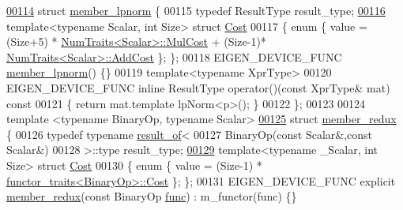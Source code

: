 \begin{DoxyCode}
\hyperlink{struct_eigen_1_1internal_1_1member__lpnorm}{00114} \textcolor{keyword}{struct }\hyperlink{struct_eigen_1_1internal_1_1member__lpnorm}{member\_lpnorm} \{
00115   \textcolor{keyword}{typedef} ResultType result\_type;
\hyperlink{struct_eigen_1_1internal_1_1member__lpnorm_1_1_cost}{00116}   \textcolor{keyword}{template}<\textcolor{keyword}{typename} Scalar, \textcolor{keywordtype}{int} Size> \textcolor{keyword}{struct }\hyperlink{struct_eigen_1_1internal_1_1member__lpnorm_1_1_cost}{Cost}
00117   \{ \textcolor{keyword}{enum} \{ value = (Size+5) * \hyperlink{group___core___module_struct_eigen_1_1_num_traits}{NumTraits<Scalar>::MulCost} + (Size-1)*
      \hyperlink{group___core___module_struct_eigen_1_1_num_traits}{NumTraits<Scalar>::AddCost} \}; \};
00118   EIGEN\_DEVICE\_FUNC \hyperlink{struct_eigen_1_1internal_1_1member__lpnorm}{member\_lpnorm}() \{\}
00119   \textcolor{keyword}{template}<\textcolor{keyword}{typename} XprType>
00120   EIGEN\_DEVICE\_FUNC \textcolor{keyword}{inline} ResultType operator()(\textcolor{keyword}{const} XprType& mat)\textcolor{keyword}{ const}
00121 \textcolor{keyword}{  }\{ \textcolor{keywordflow}{return} mat.template lpNorm<p>(); \}
00122 \};
00123 
00124 \textcolor{keyword}{template} <\textcolor{keyword}{typename} BinaryOp, \textcolor{keyword}{typename} Scalar>
\hyperlink{struct_eigen_1_1internal_1_1member__redux}{00125} \textcolor{keyword}{struct }\hyperlink{struct_eigen_1_1internal_1_1member__redux}{member\_redux} \{
00126   \textcolor{keyword}{typedef} \textcolor{keyword}{typename} \hyperlink{struct_eigen_1_1internal_1_1result__of}{result\_of}<
00127                      BinaryOp(\textcolor{keyword}{const} Scalar&,\textcolor{keyword}{const} Scalar&)
00128                    >::type  result\_type;
\hyperlink{struct_eigen_1_1internal_1_1member__redux_1_1_cost}{00129}   \textcolor{keyword}{template}<\textcolor{keyword}{typename} \_Scalar, \textcolor{keywordtype}{int} Size> \textcolor{keyword}{struct }\hyperlink{struct_eigen_1_1internal_1_1member__redux_1_1_cost}{Cost}
00130   \{ \textcolor{keyword}{enum} \{ value = (Size-1) * \hyperlink{struct_eigen_1_1internal_1_1functor__traits}{functor\_traits<BinaryOp>::Cost} \}; \};
00131   EIGEN\_DEVICE\_FUNC \textcolor{keyword}{explicit} \hyperlink{struct_eigen_1_1internal_1_1member__redux}{member\_redux}(\textcolor{keyword}{const} BinaryOp \hyperlink{structfunc}{func}) : m\_functor(func) \{\}

\end{DoxyCode}
